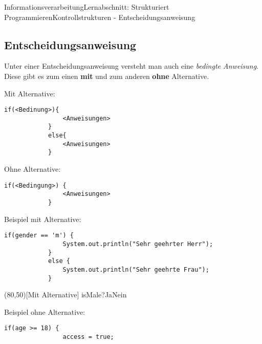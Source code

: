 \documentclass[11pt,oneside,openany,headings=optiontotoc,11pt,numbers=noenddot]{article}
\begin{document}
\begin{worksheet}{Informationsverarbeitung}{Lernabschnitt: Strukturiert Programmieren}{Kontrollstrukturen - Entscheidungsanweisung}
		\subsection{Entscheidungsanweisung}
		Unter einer Entscheidungsanweisung versteht man auch eine \textit{bedingte Anweisung}. Diese gibt es zum einen \textbf{mit} und zum anderen \textbf{ohne} Alternative.\\
		\begin{minipage}[t]{0.48\textwidth}
			\vspace*{0pt}
			Mit Alternative:
			\begin{lstlisting}[style=Python]
			if(<Bedinung>){
				<Anweisungen>
			}
			else{
				<Anweisungen>
			}
			\end{lstlisting}
		\end{minipage}
		\hfill
		\begin{minipage}[t]{0.48\textwidth}
			\vspace*{0pt}
			Ohne Alternative:
			\begin{lstlisting}[style=Python]
			if(<Bedingung>) {
				<Anweisungen>
			}
			\end{lstlisting}
		\end{minipage}
		\par\noindent
		\begin{minipage}[t]{0.48\textwidth}
			\vspace*{0pt}
			Beispiel mit Alternative:
			\begin{lstlisting}[style=Python,frame=single]
			if(gender == 'm') {
				System.out.println("Sehr geehrter Herr");
			}
			else {
				System.out.println("Sehr geehrte Frau");
			}
			\end{lstlisting}
		\end{minipage}
		\hfill
		\begin{minipage}[t]{0.48\textwidth}
			\vspace*{0pt}
			\begin{struktogramm}(80,50)[Mit Alternative]
				{isMale?}{Ja}{Nein}
				\change
				\ifend
			\end{struktogramm}
		\end{minipage}
		\begin{minipage}[t]{0.48\textwidth}
			\vspace*{0pt}
			Beispiel ohne Alternative:
			\begin{lstlisting}[style=Python,frame=single]
			if(age >= 18) {
				access = true;

\end{lstlisting}
\end{minipage}
\end{worksheet}
\end{document}
